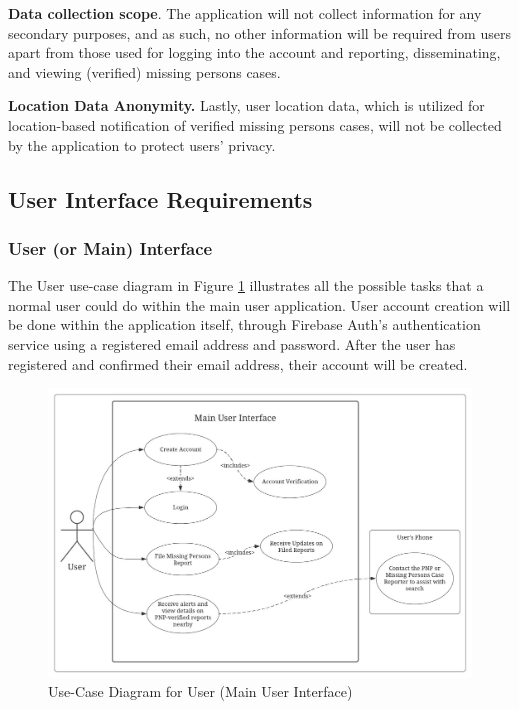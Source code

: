 \textbf{Data collection scope}. The application will not collect information for any secondary purposes, and as such, no other information will be required from users apart from those used for logging into the account and reporting, disseminating, and viewing (verified) missing persons cases.

\textbf{Location Data Anonymity.} Lastly, user location data, which is utilized for location-based notification of verified missing persons cases, will not be collected by the application to protect users’ privacy.


\subsection{User Interface Requirements}

\subsubsection{User (or Main) Interface}

The User use-case diagram in Figure \ref{fig:UseCaseMain} illustrates all the possible tasks that a normal user could do within the main user application. User account creation will be done within the application itself, through Firebase Auth’s authentication service using a registered email address and password. After the user has registered and confirmed their email address, their account will be created. 

\begin{figure}[!h]
    \centering
    \includegraphics[width=\textwidth]{figures/Chapter3/Chapt3_UseCase_Main.jpeg}
    \caption{Use-Case Diagram for User (Main User Interface)}
    \label{fig:UseCaseMain}
\end{figure}

